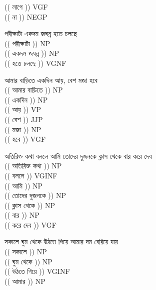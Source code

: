 \documentclass[11pt,a4paper,twocolumn]{article}
\begin{document}
\begin{enumerate}
{		\textcolor{diff}{(( লাগে ))} VGF\\
		\textcolor{diff}{(( না ))} NEGP\\
$ $\\
		\item পরীক্ষাটা একদম জঘন্ন হতে চলছে  \\
		$ $\\
		\textcolor{diff}{(( পরীক্ষাটা ))} NP\\
		\textcolor{diff}{(( একদম জঘন্ন ))} NP\\
		\textcolor{diff}{(( হতে চলছে ))} VGNF\\
$ $\\		
		\item আমার বাড়িতে একদিন আয়, বেশ মজা হবে  \\
		$ $\\
		\textcolor{diff}{(( আমার বাড়িতে ))} NP\\
		\textcolor{diff}{(( একদিন ))} NP\\
		\textcolor{diff}{(( আয় ))} VP\\
		\textcolor{diff}{(( বেশ ))} JJP\\
		\textcolor{diff}{(( মজা ))} NP\\
		\textcolor{diff}{(( হবে ))} VGF\\
$ $\\
		\item অতিরিক্ত কথা বললে আমি তোদের দুজনকে ক্লাস থেকে বার করে দেব\\
		$ $\\
		\textcolor{diff}{(( অতিরিক্ত কথা ))} NP\\		
		\textcolor{diff}{(( বললে ))} VGINF\\		
		\textcolor{diff}{(( আমি ))} NP\\		
		\textcolor{diff}{(( তোদের দুজনকে ))} NP\\		
		\textcolor{diff}{(( ক্লাস থেকে ))} NP\\		
		\textcolor{diff}{(( বার ))} NP\\		
		\textcolor{diff}{(( করে দেব ))} VGF\\
$ $\\		
		\item সকালে ঘুম থেকে উঠতে গিয়ে আমার দম বেরিয়ে যায় \\
		$ $\\
		\textcolor{diff}{(( সকালে ))} NP\\		
		\textcolor{diff}{(( ঘুম থেকে ))} NP\\		
		\textcolor{diff}{(( উঠতে গিয়ে ))} VGINF\\		
		\textcolor{diff}{(( আমার ))} NP\\		
}
\end{enumerate}
\end{document}
